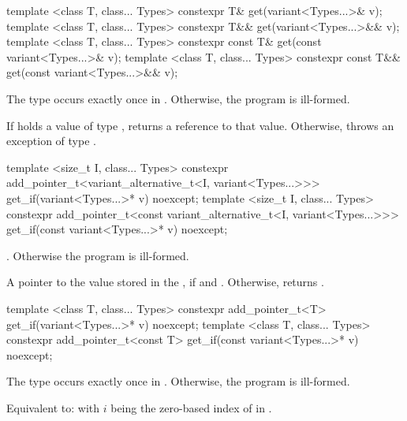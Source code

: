 %
\begin{itemdecl}
template <class T, class... Types> constexpr T& get(variant<Types...>& v);
template <class T, class... Types> constexpr T&& get(variant<Types...>&& v);
template <class T, class... Types> constexpr const T& get(const variant<Types...>& v);
template <class T, class... Types> constexpr const T&& get(const variant<Types...>&& v);
\end{itemdecl}

\begin{itemdescr}
\pnum
\requires
The type  occurs exactly once in .
Otherwise, the program is ill-formed.

\pnum
\effects
If  holds a value of type , returns a reference to that value.
Otherwise, throws an exception of type .
\end{itemdescr}

%
%
\begin{itemdecl}
template <size_t I, class... Types>
  constexpr add_pointer_t<variant_alternative_t<I, variant<Types...>>>
    get_if(variant<Types...>* v) noexcept;
template <size_t I, class... Types>
  constexpr add_pointer_t<const variant_alternative_t<I, variant<Types...>>>
    get_if(const variant<Types...>* v) noexcept;
\end{itemdecl}

\begin{itemdescr}
\pnum
\requires
{}.
Otherwise the program is ill-formed.

\pnum
\returns
A pointer to the value stored in the , if 
and . Otherwise, returns .
\end{itemdescr}

%
%
\begin{itemdecl}
template <class T, class... Types>
  constexpr add_pointer_t<T>
    get_if(variant<Types...>* v) noexcept;
template <class T, class... Types>
  constexpr add_pointer_t<const T>
    get_if(const variant<Types...>* v) noexcept;
\end{itemdecl}

\begin{itemdescr}
\pnum
\requires
The type  occurs exactly once in .
Otherwise, the program is ill-formed.

\pnum
\effects
Equivalent to:  with $i$ being the zero-based
index of  in .
\end{itemdescr}

